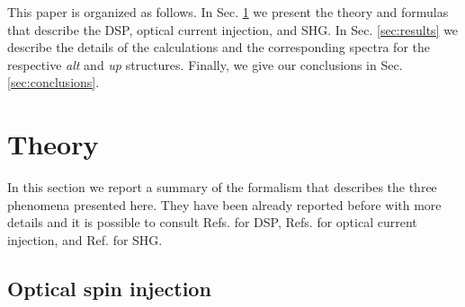 \documentclass[pss]{wiley2sp} %
\begin{document}
This paper is organized as follows. In Sec. \ref{sec:theory} we present the theory and formulas that describe the DSP, optical current injection, and SHG. In Sec. \ref{sec:results} we describe the details of the calculations and the corresponding spectra for the respective \emph{alt} and \emph{up} structures. Finally, we give our conclusions in Sec. \ref{sec:conclusions}.


\section{Theory}\label{sec:theory}

In this section we report a summary of the formalism that describes the three phenomena presented here. They have been already reported before with more details and it is possible to consult Refs. \cite{nastosPRB07,mendozaPRB12} for DSP, Refs. \cite{cabellosPRB11,sipePRB00} for optical current injection, and Ref. \cite{andersonPRB15} for SHG.


\subsection{Optical spin injection}\label{sec:theory-DSP}
\end{document}
